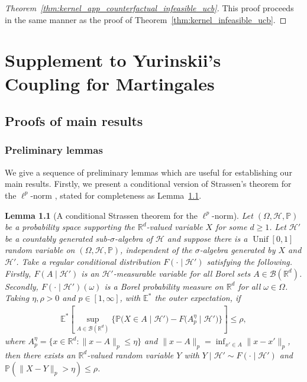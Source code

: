 \documentclass[11pt,lof]{puthesis}
\renewcommand{\P}{\ensuremath{\mathbb{P}}}
\newcommand{\R}{\ensuremath{\mathbb{R}}}
\newcommand{\E}{\ensuremath{\mathbb{E}}}
\newcommand{\cH}{\ensuremath{\mathcal{H}}}
\newcommand{\cB}{\ensuremath{\mathcal{B}}}
\DeclareMathOperator{\Unif}{Unif}
\theoremstyle{break}
\newtheorem{lemma}{Lemma}[section]
\theoremstyle{proof}
\newtheorem{proof}{Proof}
\begin{document}
\begin{proof}[Theorem~\ref{thm:kernel_app_counterfactual_infeasible_ucb}]
This proof proceeds in the same manner as the proof of
Theorem~\ref{thm:kernel_infeasible_ucb}.
\end{proof}

\chapter[Supplement to Yurinskii's Coupling for Martingales]%
{Supplement to Yurinskii's \\ Coupling for Martingales}
\label{app:yurinskii}

\section{Proofs of main results}
\label{sec:yurinskii_app_proofs}

\subsection{Preliminary lemmas}

We give a sequence of preliminary lemmas which are useful for establishing our
main results. Firstly, we present a conditional version of Strassen's theorem
for the $\ell^p$-norm \citep[Theorem~B.2]{chen2020jackknife}, stated for
completeness as Lemma~\ref{lem:yurinskii_app_strassen}.

\begin{lemma}[A conditional Strassen theorem for the
\texorpdfstring{$\ell^p$}{lp}-norm]%
\label{lem:yurinskii_app_strassen}
%
Let $(\Omega, \cH, \P)$ be a probability space supporting the $\R^d$-valued
variable $X$ for some $d \geq 1$. Let $\cH'$ be a countably generated
sub-$\sigma$-algebra of $\cH$ and suppose there is a $\Unif[0,1]$ random
variable on $(\Omega, \cH, \P)$, independent of the $\sigma$-algebra
generated by $X$ and $\cH'$. Take a regular conditional distribution
$F(\cdot \mid \cH')$ satisfying the following. Firstly, $F(A \mid \cH')$ is
an $\cH'$-measurable variable for all Borel sets $A \in \cB(\R^d)$.
Secondly, $F(\cdot \mid \cH')(\omega)$ is a Borel probability measure on
$\R^d$ for all $\omega \in \Omega$. Taking $\eta, \rho > 0$ and
$p \in [1, \infty]$, with $\E^*$ the outer expectation, if
%
\begin{align*}
\E^* \left[
\sup_{A \in \cB(\R^d)}
\Big\{
\P \big( X \in A \mid \cH' \big)
- F \big( A_p^\eta \mid \cH' \big)
\Big\}
\right]
\leq \rho,
\end{align*}
%
where $A_p^\eta = \{x \in \R^d : \|x - A\|_p \leq \eta\}$
and $\|x - A\|_p = \inf_{x' \in A} \|x - x'\|_p$,
then there exists an $\R^d$-valued random variable $Y$
with $Y \mid \cH' \sim F(\cdot \mid \cH')$
and $\P \left( \|X-Y\|_p > \eta \right) \leq \rho$.
%
\end{lemma}
\end{document}
